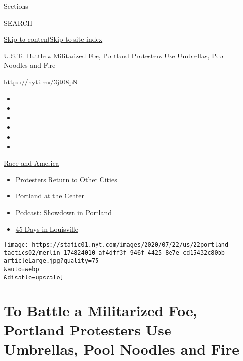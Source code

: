 Sections

SEARCH

\protect\hyperlink{site-content}{Skip to
content}\protect\hyperlink{site-index}{Skip to site index}

\href{/section/us}{U.S.}\textbar{}To Battle a Militarized Foe, Portland
Protesters Use Umbrellas, Pool Noodles and Fire

\url{https://nyti.ms/3jt08pN}

\begin{itemize}
\item
\item
\item
\item
\item
\item
\end{itemize}

\href{https://www.nytimes.com/news-event/george-floyd-protests-minneapolis-new-york-los-angeles?action=click\&pgtype=Article\&state=default\&region=TOP_BANNER\&context=storylines_menu}{Race
and America}

\begin{itemize}
\tightlist
\item
  \href{https://www.nytimes.com/2020/07/26/us/protests-portland-seattle-trump.html?action=click\&pgtype=Article\&state=default\&region=TOP_BANNER\&context=storylines_menu}{Protesters
  Return to Other Cities}
\item
  \href{https://www.nytimes.com/2020/07/24/us/portland-oregon-protests-white-race.html?action=click\&pgtype=Article\&state=default\&region=TOP_BANNER\&context=storylines_menu}{Portland
  at the Center}
\item
  \href{https://www.nytimes.com/2020/07/23/podcasts/the-daily/portland-protests.html?action=click\&pgtype=Article\&state=default\&region=TOP_BANNER\&context=storylines_menu}{Podcast:
  Showdown in Portland}
\item
  \href{https://www.nytimes.com/interactive/2020/07/16/us/black-lives-matter-protests-louisville-breonna-taylor.html?action=click\&pgtype=Article\&state=default\&region=TOP_BANNER\&context=storylines_menu}{45
  Days in Louisville}
\end{itemize}

\texttt{[image: https://static01.nyt.com/images/2020/07/22/us/22portland-tactics02/merlin\_174824010\_af4dff3f-946f-4425-8e7e-cd15432c80bb-articleLarge.jpg?quality=75\\\&auto=webp\\\&disable=upscale]}

\hypertarget{to-battle-a-militarized-foe-portland-protesters-use-umbrellas-pool-noodles-and-fire}{%
\section{To Battle a Militarized Foe, Portland Protesters Use Umbrellas,
Pool Noodles and
Fire}\label{to-battle-a-militarized-foe-portland-protesters-use-umbrellas-pool-noodles-and-fire}}

